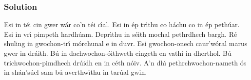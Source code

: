 \newpage
\subsubsection{Solution}

Esi in t\'{e}i cin gwer w\'{a}r co'n t\'{e}i c\'{\i}al.
Esi in \'{e}p tr\'{\i}thu co h\'{a}chu co in \'{e}p peth\'{u}ar.
Esi in vr\'{\i} pimpeth hardh\'{u}am.
Depr\'{\i}thu in s\'{e}ith mochal pethrdhech bargh.
R\'{e} shuling in gwochon-tr\'{\i} m\'{o}rchunal e in duvr.
Esi gwochon-onech caur'w\'{o}ral marus gwer in dr\'{a}ith.
B\'{u} in dachwochon-\'{o}ithweth cingeth en vathi in dherthol.
B\'{u} trichwochon-pimdhech dr\'{u}idh en in c\'{e}th n\'{o}iv.
A'n dh\'{\i} pethrchwochon-nameth \'{o}s in sh\'{a}n's\'{u}el sam b\'{u} averthw\'{\i}thu in tar\'{u}al gwin.
